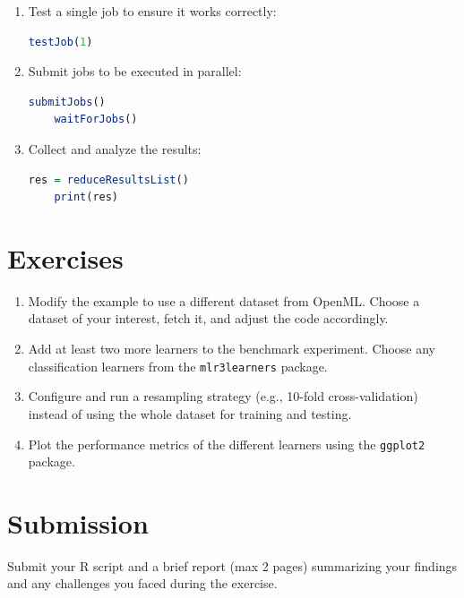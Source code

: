 \documentclass[a4paper,11pt]{article}
\begin{document}
\begin{enumerate}
    \item Test a single job to ensure it works correctly:
    \begin{lstlisting}[language=R]
    testJob(1)
    \end{lstlisting}

    \item Submit jobs to be executed in parallel:
    \begin{lstlisting}[language=R]
    submitJobs()
    waitForJobs()
    \end{lstlisting}

    \item Collect and analyze the results:
    \begin{lstlisting}[language=R]
    res = reduceResultsList()
    print(res)
    \end{lstlisting}
\end{enumerate}

\section*{Exercises}
\begin{enumerate}
    \item Modify the example to use a different dataset from OpenML. Choose a dataset of your interest, fetch it, and adjust the code accordingly.
    \item Add at least two more learners to the benchmark experiment. Choose any classification learners from the \texttt{mlr3learners} package.
    \item Configure and run a resampling strategy (e.g., 10-fold cross-validation) instead of using the whole dataset for training and testing. 
    \item Plot the performance metrics of the different learners using the \texttt{ggplot2} package.
\end{enumerate}

\section*{Submission}
Submit your R script and a brief report (max 2 pages) summarizing your findings and any challenges you faced during the exercise.
\end{document}
